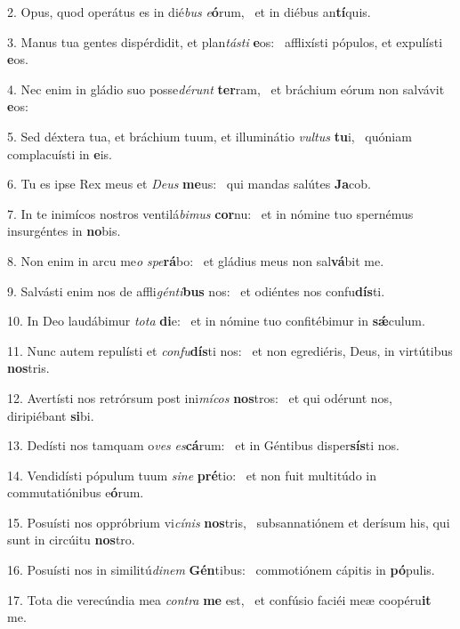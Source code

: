 2. Opus, quod operátus es in dié\textit{bus} \textit{e}\textbf{ó}rum, \ast\  et in diébus an\textbf{tí}quis.\

3. Manus tua gentes dispérdidit, et plan\textit{tás}\textit{ti} \textbf{e}os: \ast\  afflixísti pópulos, et expulísti \textbf{e}os.\

4. Nec enim in gládio suo posse\textit{dé}\textit{runt} \textbf{ter}ram, \ast\  et bráchium eórum non salvávit \textbf{e}os:\

5. Sed déxtera tua, et bráchium tuum, et illuminátio \textit{vul}\textit{tus} \textbf{tu}i, \ast\  quóniam complacuísti in \textbf{e}is.\

6. Tu es ipse Rex meus et \textit{De}\textit{us} \textbf{me}us: \ast\  qui mandas salútes \textbf{Ja}cob.\

7. In te inimícos nostros ventilá\textit{bi}\textit{mus} \textbf{cor}nu: \ast\  et in nómine tuo spernémus insurgéntes in \textbf{no}bis.\

8. Non enim in arcu me\textit{o} \textit{spe}\textbf{rá}bo: \ast\  et gládius meus non sal\textbf{vá}bit me.\

9. Salvásti enim nos de affli\textit{gén}\textit{ti}\textbf{bus} nos: \ast\  et odiéntes nos confu\textbf{dís}ti.\

10. In Deo laudábimur \textit{to}\textit{ta} \textbf{di}e: \ast\  et in nómine tuo confitébimur in \textbf{sǽ}culum.\

11. Nunc autem repulísti et \textit{con}\textit{fu}\textbf{dís}ti nos: \ast\  et non egrediéris, Deus, in virtútibus \textbf{nos}tris.\

12. Avertísti nos retrórsum post ini\textit{mí}\textit{cos} \textbf{nos}tros: \ast\  et qui odérunt nos, diripiébant \textbf{si}bi.\

13. Dedísti nos tamquam o\textit{ves} \textit{es}\textbf{cá}rum: \ast\  et in Géntibus disper\textbf{sís}ti nos.\

14. Vendidísti pópulum tuum \textit{si}\textit{ne} \textbf{pré}tio: \ast\  et non fuit multitúdo in commutatiónibus e\textbf{ó}rum.\

15. Posuísti nos oppróbrium vi\textit{cí}\textit{nis} \textbf{nos}tris, \ast\  subsannatiónem et derísum his, qui sunt in circúitu \textbf{nos}tro.\

16. Posuísti nos in similitú\textit{di}\textit{nem} \textbf{Gén}tibus: \ast\  commotiónem cápitis in \textbf{pó}pulis.\

17. Tota die verecúndia mea \textit{con}\textit{tra} \textbf{me} est, \ast\  et confúsio faciéi meæ coopéru\textbf{it} me.\

